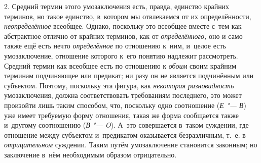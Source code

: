 2. Средний термин этого умозаключения есть, правда, единство
крайних терминов, но такое единство, в~котором мы отвлекаемся от их
определённости, {\em неопределённое}
всеобщее. Однако, поскольку это всеобщее вместе с~тем как
абстрактное отлично от крайних терминов, как от
{\em определённого,} оно
и само также ещё есть нечто
{\em определённое} по
отношению к~ним, и~целое есть умозаключение, отношение которого к~его
понятию надлежит рассмотреть. Средний термин как всеобщее есть по отношению
к {\em обоим} своим
крайним терминам подчиняющее или предикат; ни разу он не является
подчинённым или субъектом. Поэтому, поскольку эта фигура, как
{\em некоторая разновидность}
умозаключения, должна соответствовать требованиям последнего,
это может произойти лишь таким способом, что, поскольку одно соотношение
({\em Е "--- В})
уже имеет требуемую форму отношения, такая же форма
сообщается также и~другому соотношению
({\em В "--- O}). А~это
совершается в~таком суждении, где отношение между субъектом и~предикатом
оказывается безразличным, т.~е. в
{\em отрицательном}
суждении. Таким путём умозаключение становится законным; но
заключение в~нём необходимым образом
отрицательно.


